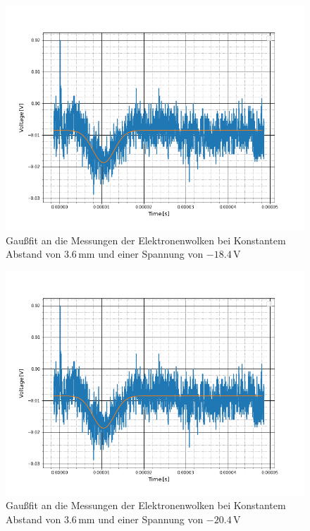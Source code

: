 \begin{figure}
	\includegraphics[scale=0.5]{Bild/A1}
	\centering
	\caption[Gaußfit an Messung bei Konst. Abstand]{Gaußfit an die Messungen der Elektronenwolken bei Konstantem Abstand von $3.6$\,mm und einer Spannung von $-18.4$\,V}
\end{figure}
\begin{figure}
	\includegraphics[scale=0.5]{Bild/A1}
	\centering
	\caption[Gaußfit an Messung bei Konst. Abstand]{Gaußfit an die Messungen der Elektronenwolken bei Konstantem Abstand von $3.6$\,mm und einer Spannung von $-20.4$\,V}
\end{figure}
